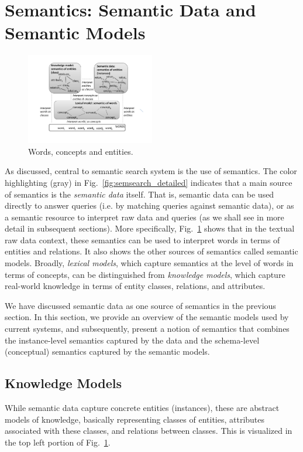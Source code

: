 \section{Semantics: Semantic Data and Semantic Models}\label{sec:semantics}
\begin{figure}[thb]
	\centering
		\includegraphics[width=0.5\textwidth]{figs/semantic_layer.pdf}
	\caption{Words, concepts and entities.}
	\label{fig:semantic_layer}
\end{figure}

As discussed, central to semantic search system is the use of semantics. The color highlighting (gray) in Fig.~\ref{fig:semsearch_detailed} indicates that a main source of semantics is the \emph{semantic data} itself. That is, semantic data can be used directly to answer queries (i.e. by matching queries against semantic data), or as a semantic resource to interpret raw data and queries (as we shall see in more detail in subsequent sections). More specifically, Fig.~\ref{fig:semantic_layer} shows that in the textual raw data context, these semantics can be used to interpret words in terms of entities and relations. It also shows the other sources of semantics called semantic models. Broadly, \emph{lexical models}, which capture semantics at the level of words in terms of concepts, can be distinguished from \emph{knowledge models}, which capture real-world knowledge in terms of entity classes, relations, and attributes. 

We have discussed semantic data as one source of semantics in the previous section. In this section, we provide an overview of the semantic models used by current systems, and subsequently, present a notion of semantics that combines the instance-level semantics captured by the data and the schema-level (conceptual) semantics captured by the semantic models. 

\subsection{Knowledge Models} While semantic data capture concrete entities (instances), these are abstract models of knowledge, basically representing classes of entities, attributes associated with these classes, and relations between classes. This is visualized in the top left portion of Fig.~\ref{fig:semantic_layer}.  

